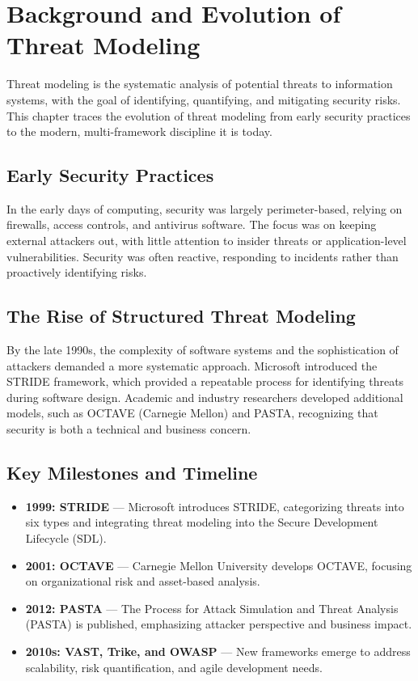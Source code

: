 \section*{Background and Evolution of Threat Modeling}
Threat modeling is the systematic analysis of potential threats to information systems, with the goal of identifying, quantifying, and mitigating security risks\cite{shostack2014,uceda2015}. This chapter traces the evolution of threat modeling from early security practices to the modern, multi-framework discipline it is today.

\subsection*{Early Security Practices}
In the early days of computing, security was largely perimeter-based, relying on firewalls, access controls, and antivirus software. The focus was on keeping external attackers out, with little attention to insider threats or application-level vulnerabilities\cite{schneier1999}. Security was often reactive, responding to incidents rather than proactively identifying risks.

\subsection*{The Rise of Structured Threat Modeling}
By the late 1990s, the complexity of software systems and the sophistication of attackers demanded a more systematic approach. Microsoft introduced the STRIDE framework\cite{shostack2014}, which provided a repeatable process for identifying threats during software design. Academic and industry researchers developed additional models, such as OCTAVE (Carnegie Mellon) and PASTA\cite{uceda2015}, recognizing that security is both a technical and business concern.

\subsection*{Key Milestones and Timeline}
\begin{itemize}
	\item \textbf{1999: STRIDE} — Microsoft introduces STRIDE, categorizing threats into six types and integrating threat modeling into the Secure Development Lifecycle (SDL)\cite{shostack2014}.
	\item \textbf{2001: OCTAVE} — Carnegie Mellon University develops OCTAVE, focusing on organizational risk and asset-based analysis.
	\item \textbf{2012: PASTA} — The Process for Attack Simulation and Threat Analysis (PASTA) is published, emphasizing attacker perspective and business impact\cite{uceda2015}.
	\item \textbf{2010s: VAST, Trike, and OWASP} — New frameworks emerge to address scalability, risk quantification, and agile development needs\cite{owasp}.
\end{itemize}

